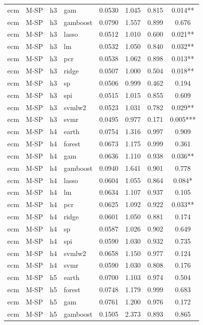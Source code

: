 \begin{ThreePartTable}
\begin{longtable}[t]{llclcccc}
ecm & M-SP & h3 & gam & 0.0530 & 1.045 & 0.815 & 0.014**\\
ecm & M-SP & h3 & gamboost & 0.0790 & 1.557 & 0.899 & 0.676\\
ecm & M-SP & h3 & lasso & 0.0512 & 1.010 & 0.600 & 0.021**\\
ecm & M-SP & h3 & lm & 0.0532 & 1.050 & 0.840 & 0.032**\\
ecm & M-SP & h3 & pcr & 0.0538 & 1.062 & 0.898 & 0.013**\\
ecm & M-SP & h3 & ridge & 0.0507 & 1.000 & 0.504 & 0.018**\\
ecm & M-SP & h3 & sp & 0.0506 & 0.999 & 0.462 & 0.194\\
ecm & M-SP & h3 & spi & 0.0515 & 1.015 & 0.855 & 0.609\\
ecm & M-SP & h3 & svmlw2 & 0.0523 & 1.031 & 0.782 & 0.029**\\
ecm & M-SP & h3 & svmr & 0.0495 & 0.977 & 0.171 & 0.005***\\
\addlinespace
ecm & M-SP & h4 & earth & 0.0754 & 1.316 & 0.997 & 0.909\\
ecm & M-SP & h4 & forest & 0.0673 & 1.175 & 0.999 & 0.361\\
ecm & M-SP & h4 & gam & 0.0636 & 1.110 & 0.938 & 0.036**\\
ecm & M-SP & h4 & gamboost & 0.0940 & 1.641 & 0.901 & 0.778\\
ecm & M-SP & h4 & lasso & 0.0604 & 1.055 & 0.864 & 0.084*\\
ecm & M-SP & h4 & lm & 0.0634 & 1.107 & 0.937 & 0.105\\
ecm & M-SP & h4 & pcr & 0.0625 & 1.092 & 0.922 & 0.033**\\
ecm & M-SP & h4 & ridge & 0.0601 & 1.050 & 0.881 & 0.174\\
ecm & M-SP & h4 & sp & 0.0587 & 1.026 & 0.902 & 0.649\\
ecm & M-SP & h4 & spi & 0.0590 & 1.030 & 0.932 & 0.735\\
ecm & M-SP & h4 & svmlw2 & 0.0658 & 1.150 & 0.977 & 0.124\\
ecm & M-SP & h4 & svmr & 0.0590 & 1.030 & 0.808 & 0.176\\
\addlinespace
ecm & M-SP & h5 & earth & 0.0700 & 1.103 & 0.974 & 0.504\\
ecm & M-SP & h5 & forest & 0.0748 & 1.179 & 0.999 & 0.683\\
ecm & M-SP & h5 & gam & 0.0761 & 1.200 & 0.976 & 0.172\\
ecm & M-SP & h5 & gamboost & 0.1505 & 2.373 & 0.893 & 0.865\\

\end{longtable}
\end{ThreePartTable}
